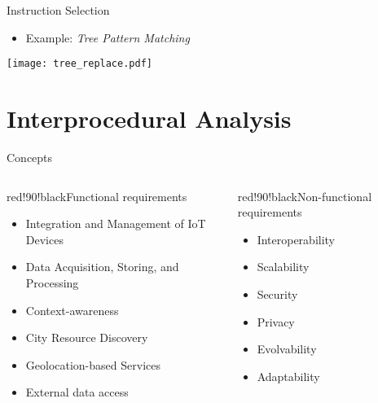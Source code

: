 
\begin{frame}{Instruction Selection}

\begin{itemize}
    \item Example: \textit{Tree Pattern Matching}
\end{itemize}
\begin{center}
	 \texttt{[image: tree\_replace.pdf]}
\end{center}

\end{frame}


\section{Interprocedural Analysis}

\begin{frame}{Concepts}
  \begin{columns}[t]
    \col
      \begin{coloredblock}{red!90!black}{Functional requirements}
        \begin{itemize}
          \item Integration and Management of IoT Devices
          \item Data Acquisition, Storing, and Processing
          \item Context-awareness
          \item City Resource Discovery
          \item Geolocation-based Services
          \item External data access
        \end{itemize}
      \end{coloredblock}

    \col
      \begin{coloredblock}{red!90!black}{Non-functional requirements}
        \begin{itemize}
          \item Interoperability
          \item Scalability
          \item Security
          \item Privacy
          \item Evolvability
          \item Adaptability
        \end{itemize}
      \end{coloredblock}
  \end{columns}
\end{frame}

